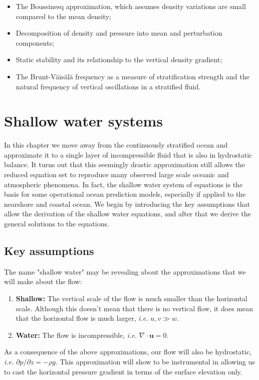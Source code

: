 \documentclass[12pt]{article}
\numberwithin{equation}{section}
\numberwithin{figure}{section}
\numberwithin{table}{section}
\begin{document}
\begin{itemize}
  \item The Boussinesq approximation, which assumes density variations are small
  compared to the mean density;
  \item Decomposition of density and pressure into mean and perturbation components;
  \item Static stability and its relationship to the vertical density gradient;
  \item The Brunt-Väisälä frequency as a measure of stratification strength and
  the natural frequency of vertical oscillations in a stratified fluid.
\end{itemize}

\newpage
\section{Shallow water systems}
\label{sec:shallow_water_systems}

In this chapter we move away from the continuously stratified ocean and
approximate it to a single layer of incompressible fluid that is also in
hydrostatic balance.
It turns out that this seemingly drastic approximation still allows the
reduced equation set to reproduce many observed large scale oceanic and
atmospheric phenomena.
In fact, the shallow water system of equations is the basis for some operational
ocean prediction models, especially if applied to the nearshore and coastal
ocean.
We begin by introducing the key assumptions that allow the derivation of the
shallow water equations, and after that we derive the general solutions to the
equations.

\subsection{Key assumptions}

The name "shallow water" may be revealing about the approximations that we will
make about the flow:

\begin{enumerate}
  \item \textbf{Shallow:} The vertical scale of the flow is much smaller than the
    horizontal scale. Although this doesn't mean that there is no vertical
    flow, it does mean that the horizontal flow is much larger,
    \textit{i.e.} $u, v \gg w$.
  \item \textbf{Water:} The flow is incompressible, \textit{i.e.}
  $\nabla \cdot \mathbf{u} = 0$.
\end{enumerate}
As a consequence of the above approximations, our flow will also be hydrostatic,
\textit{i.e.} $\partial p / \partial z = -\rho g$.
This approximation will show to be instrumental in allowing us to cast the 
horizontal pressure gradient in terms of the surface elevation only.
\end{document}
